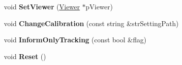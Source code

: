 \begin{DoxyCompactItemize}
\item 
\hypertarget{classORB__SLAM2_1_1Tracking_ac86c2461ac6cf3bec906759f4fbea15c}{void {\bfseries Set\-Viewer} (\hyperlink{classORB__SLAM2_1_1Viewer}{Viewer} $\ast$p\-Viewer)}\label{classORB__SLAM2_1_1Tracking_ac86c2461ac6cf3bec906759f4fbea15c}

\item 
\hypertarget{classORB__SLAM2_1_1Tracking_a7be9bebf51fda1413d253224cdacf7cd}{void {\bfseries Change\-Calibration} (const string \&str\-Setting\-Path)}\label{classORB__SLAM2_1_1Tracking_a7be9bebf51fda1413d253224cdacf7cd}

\item 
\hypertarget{classORB__SLAM2_1_1Tracking_abb047099ca3376f7aabc9a90c74aecfc}{void {\bfseries Inform\-Only\-Tracking} (const bool \&flag)}\label{classORB__SLAM2_1_1Tracking_abb047099ca3376f7aabc9a90c74aecfc}

\item 
\hypertarget{classORB__SLAM2_1_1Tracking_a899967ca49b1c3446854ecce3873323c}{void {\bfseries Reset} ()}\label{classORB__SLAM2_1_1Tracking_a899967ca49b1c3446854ecce3873323c}

\end{DoxyCompactItemize}
